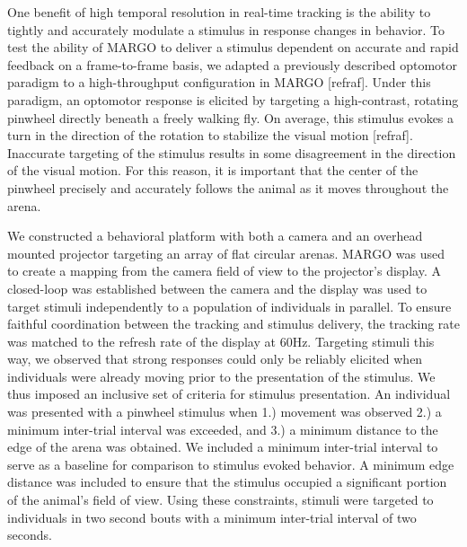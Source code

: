\documentclass[10pt]{article}
\begin{document}
\begin{multicols}{2}
One benefit of high temporal resolution in real-time tracking is the ability to tightly and accurately modulate a stimulus in response changes in behavior. To test the ability of MARGO to deliver a stimulus dependent on accurate and rapid feedback on a frame-to-frame basis, we adapted a previously described optomotor paradigm to a high-throughput configuration in MARGO [refraf]. Under this paradigm, an optomotor response is elicited by targeting a high-contrast, rotating pinwheel directly beneath a freely walking fly. On average, this stimulus evokes a turn in the direction of the rotation to stabilize the visual motion [refraf]. Inaccurate targeting of the stimulus results in some disagreement in the direction of the visual motion. For this reason, it is important that the center of the pinwheel precisely and accurately follows the animal as it moves throughout the arena.

We constructed a behavioral platform with both a camera and an overhead mounted projector targeting an array of flat circular arenas. MARGO was used to create a mapping from the camera field of view to the projector's display. A closed-loop was established between the camera and the display was used to target stimuli independently to a population of individuals in parallel. To ensure faithful coordination between the tracking and stimulus delivery, the tracking rate was matched to the refresh rate of the display at 60Hz. Targeting stimuli this way, we observed that strong responses could only be reliably elicited when individuals were already moving prior to the presentation of the stimulus. We thus imposed an inclusive set of criteria for stimulus presentation. An individual was presented with a pinwheel stimulus when 1.) movement was observed 2.) a minimum inter-trial interval was exceeded, and 3.) a minimum distance to the edge of the arena was obtained. We included a minimum inter-trial interval to serve as a baseline for comparison to stimulus evoked behavior. A minimum edge distance was included to ensure that the stimulus occupied a significant portion of the animal's field of view. Using these constraints, stimuli were targeted to individuals in two second bouts with a minimum inter-trial interval of two seconds. 


\end{multicols}
\end{document}
